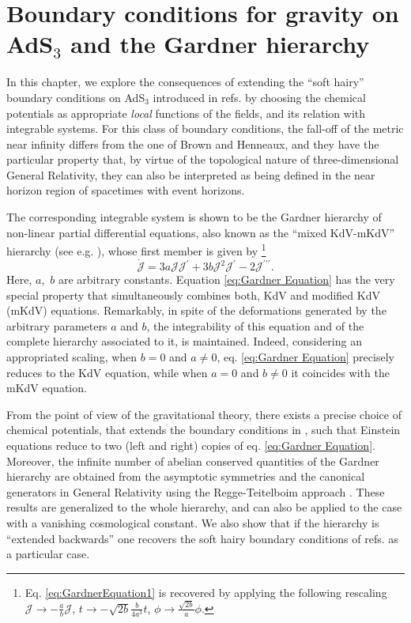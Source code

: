 \documentclass[letterpaper,11pt,oneside]{book}
\begin{document}
\chapter{Boundary conditions for gravity on AdS$_{3}$ and the Gardner hierarchy \label{chapter:Gardner Part}}

In this chapter, we explore the consequences of extending the ``soft
hairy'' boundary conditions on AdS$_{3}$ introduced in refs. \cite{Afshar:2016wfy,Afshar:2016kjj}
by choosing the chemical potentials as appropriate \emph{local} functions
of the fields, and its relation with integrable systems. For this
class of boundary conditions, the fall-off of the metric near infinity
differs from the one of Brown and Henneaux, and they have the particular
property that, by virtue of the topological nature of three-dimensional
General Relativity, they can also be interpreted as being defined
in the near horizon region of spacetimes with event horizons. 

The corresponding integrable system is shown to be the Gardner hierarchy
of non-linear partial differential equations, also known as the ``mixed
KdV-mKdV'' hierarchy (see e.g. \cite{Ames1992nonlinear}), whose
first member is given by \footnote{Eq. \eqref{eq:GardnerEquation1} is recovered by applying the following rescaling $\mathcal{J} \rightarrow -\frac{a}{b}\mathcal{J}$, $t \rightarrow -\sqrt{2b}\frac{b}{4a^3} t $,  $\phi  \rightarrow \frac{\sqrt{2b}}{a} \phi  $.}
\begin{equation}
	\dot{\mathcal{J}}=3a\mathcal{J}\mathcal{J^{\prime}}+3b\mathcal{J}^{2}\mathcal{J^{\prime}}-2\mathcal{J^{\prime\prime\prime}}.\label{eq:Gardner Equation}
\end{equation}
Here, $a,$ $b$ are arbitrary constants. Equation \eqref{eq:Gardner Equation}
has the very special property that simultaneously combines both, KdV
and modified KdV (mKdV) equations. Remarkably, in spite of the deformations
generated by the arbitrary parameters $a$ and $b$, the integrability
of this equation and of the complete hierarchy associated to it, is
maintained. Indeed, considering an appropriated scaling, when $b=0$
and $a\neq0$, eq. \eqref{eq:Gardner Equation} precisely reduces
to the KdV equation, while when $a=0$ and
$b\neq0$ it coincides with the mKdV equation.

From the point of view of the gravitational theory, there exists a
precise choice of chemical potentials, that extends the boundary conditions
in \cite{Afshar:2016wfy,Afshar:2016kjj}, such that Einstein equations
reduce to two (left and right) copies of eq. \eqref{eq:Gardner Equation}.
Moreover, the infinite number of abelian conserved quantities of the
Gardner hierarchy are obtained from the asymptotic symmetries and
the canonical generators in General Relativity using the Regge-Teitelboim
approach \cite{Regge:1974zd}. These results are generalized to the
whole hierarchy, and can also be applied to the case with a vanishing
cosmological constant. We also show that if the hierarchy is ``extended
backwards'' one recovers the soft hairy boundary conditions of refs.
\cite{Afshar:2016wfy,Afshar:2016kjj} as a particular case.
\end{document}
